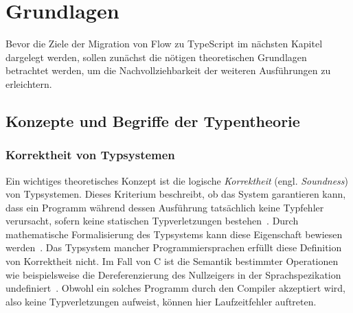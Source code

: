 \chapter{Grundlagen}
\label{chap:basics}

Bevor die Ziele der Migration von Flow zu TypeScript im nächsten Kapitel dargelegt werden, sollen zunächst die nötigen theoretischen Grundlagen betrachtet werden, um die Nachvollziehbarkeit der weiteren Ausführungen zu erleichtern.

\section{Konzepte und Begriffe der Typentheorie}

\subsection{Korrektheit von Typsystemen}
Ein wichtiges theoretisches Konzept ist die logische \emph{Korrektheit} (engl. \emph{Soundness}) von Typsystemen. Dieses Kriterium beschreibt, ob das System garantieren kann, dass ein Programm während dessen Ausführung tatsächlich keine Typfehler verursacht, sofern keine statischen Typverletzungen bestehen~\autocite{WRIGHT:1994}. Durch mathematische Formalisierung des Typsystems kann diese Eigenschaft bewiesen werden~\autocite[7]{CARDELLI:TYPE_SYSTEMS}.
Das Typsystem mancher Programmiersprachen erfüllt diese Definition von Korrektheit nicht. Im Fall von C ist die Semantik bestimmter Operationen wie beispielsweise die Dereferenzierung des Nullzeigers in der Sprachspezikation undefiniert~\autocite[79]{ISO:C99}. Obwohl ein solches Programm durch den Compiler akzeptiert wird, also keine Typverletzungen aufweist, können hier Laufzeitfehler auftreten.



